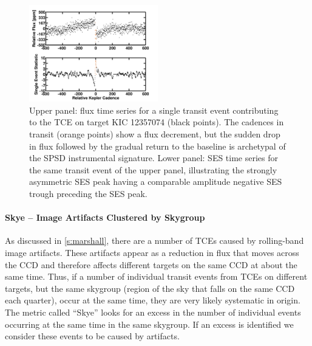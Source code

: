 \begin{figure}[h!]
\includegraphics[width=0.5\textwidth]{kic12357074_spsd.png}
\caption{Upper panel: flux time series for a single transit event contributing to the TCE on target KIC 12357074 (black points).  The cadences in transit (orange points) show a flux decrement, but the sudden drop in flux followed by the gradual return to the baseline is archetypal of the SPSD instrumental signature.  Lower panel: SES time series for the same transit event of the upper panel, illustrating the strongly asymmetric SES peak having a comparable amplitude negative SES trough preceding the SES peak.}
\label{fig:chases3}
\end{figure}





\paragraph{Skye -- Image Artifacts Clustered by Skygroup}
\label{s:skye}


As discussed in \ref{s:marshall}, there are a number of TCEs caused by rolling-band image artifacts. These artifacts appear as a reduction in flux that moves across the CCD and therefore affects different targets on the same CCD at about the same time. Thus, if a number of individual transit events from TCEs on different targets, but the same skygroup (region of the sky that falls on the same CCD each quarter), occur at the same time, they are very likely systematic in origin. The metric called ``Skye'' looks for an excess in the number of individual events occurring at the same time in the same skygroup. If an excess is identified we consider these events to be caused by artifacts. 

